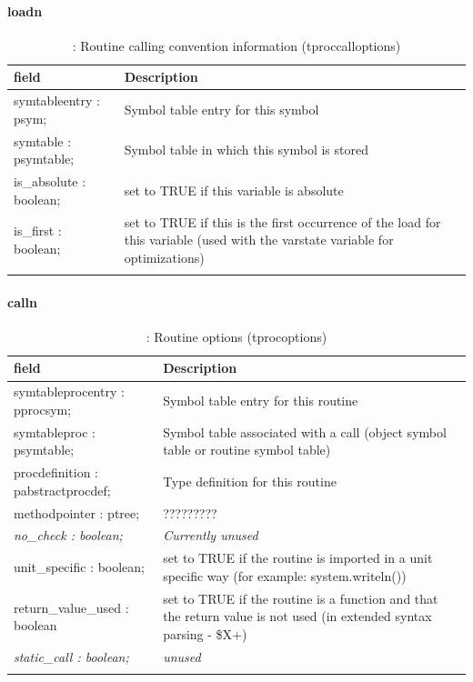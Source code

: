 \documentclass [12pt]{article}
\begin{document}
\paragraph{loadn}\mbox{}

\begin{longtable}{|l|p{10cm}|}
\hline
field	& Description \\
\hline
\endhead
\hline
\endfoot
\textsf{symtableentry : psym;}& 
Symbol table entry for this symbol \\
\textsf{symtable : psymtable;}& 
Symbol table in which this symbol is stored \\
\textsf{is{\_}absolute : boolean;}& 
set to TRUE if this variable is absolute \\
\textsf{is{\_}first : boolean;}& 
set to TRUE if this is the first occurrence of the load for this variable (used with the varstate variable for optimizations) \\
\hline
\caption{: Routine calling convention information (tproccalloptions)}
\label{tab12}
\end{longtable}

\paragraph{calln}\mbox{}

\begin{longtable}{|l|p{10cm}|}
\hline
field	& Description \\
\hline
\endhead
\hline
\endfoot
\textsf{symtableprocentry : pprocsym;}& 
Symbol table entry for this routine \\
\textsf{symtableproc : psymtable;}& 
Symbol table associated with a call (object symbol table or routine symbol table) \\
\textsf{procdefinition : pabstractprocdef;}& 
Type definition for this routine \\
\textsf{methodpointer : ptree;}& 
????????? \\
\textsf{\textit{no{\_}check : boolean;}}& 
\textit{Currently unused} \\
\textsf{unit{\_}specific : boolean;}& 
set to TRUE if the routine is imported in a unit specific way (for example: system.writeln()) \\
\textsf{return{\_}value{\_}used : boolean}& 
set to TRUE if the routine is a function and that the return value is not used (in extended syntax parsing - {\$}X+) \\
\textsf{\textit{static{\_}call : boolean;}}& 
\textit{unused} \\
\hline
\caption{: Routine options (tprocoptions)}
\label{tab13}
\end{longtable}
\end{document}
